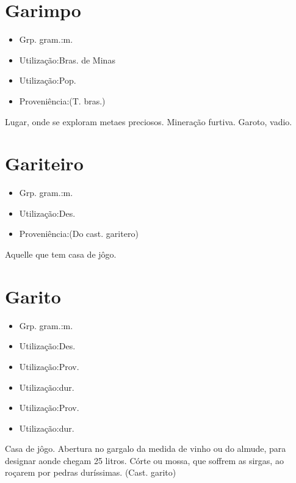 \section{Garimpo}
\begin{itemize}
\item {Grp. gram.:m.}
\end{itemize}
\begin{itemize}
\item {Utilização:Bras. de Minas}
\end{itemize}
\begin{itemize}
\item {Utilização:Pop.}
\end{itemize}
\begin{itemize}
\item {Proveniência:(T. bras.)}
\end{itemize}
Lugar, onde se exploram metaes preciosos.
Mineração furtiva.
Garoto, vadio.
\section{Gariteiro}
\begin{itemize}
\item {Grp. gram.:m.}
\end{itemize}
\begin{itemize}
\item {Utilização:Des.}
\end{itemize}
\begin{itemize}
\item {Proveniência:(Do cast. \textunderscore garitero\textunderscore )}
\end{itemize}
Aquelle que tem casa de jôgo.
\section{Garito}
\begin{itemize}
\item {Grp. gram.:m.}
\end{itemize}
\begin{itemize}
\item {Utilização:Des.}
\end{itemize}
\begin{itemize}
\item {Utilização:Prov.}
\end{itemize}
\begin{itemize}
\item {Utilização:dur.}
\end{itemize}
\begin{itemize}
\item {Utilização:Prov.}
\end{itemize}
\begin{itemize}
\item {Utilização:dur.}
\end{itemize}
Casa de jôgo.
Abertura no gargalo da medida de vinho ou do almude, para designar aonde chegam 25 litros.
Córte ou mossa, que soffrem as sirgas, ao roçarem por pedras duríssimas.
(Cast. \textunderscore garito\textunderscore )
